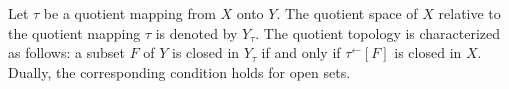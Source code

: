 Let $\tau$ be a quotient mapping from $X$ onto $Y$. The quotient space of $X$ relative to the quotient mapping $\tau$ is denoted by $Y_{\tau}$. The quotient topology is characterized as follows: a subset $F$ of $Y$ is closed in $Y_{\tau}$ if and only if $\tau^{\leftarrow}[F]$ is closed in $X$. Dually, the corresponding condition holds for open sets.
